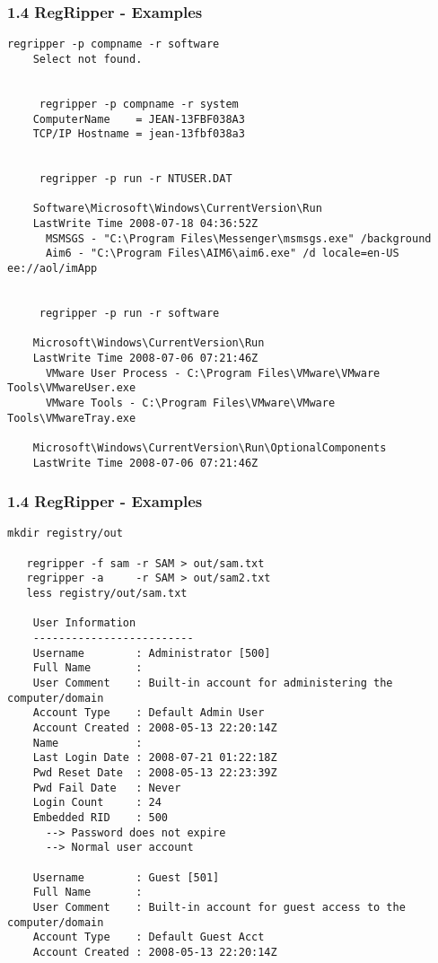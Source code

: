\begin{frame}[fragile]
  \frametitle{1.4 RegRipper - Examples}
  \begin{lstlisting}[basicstyle=\tiny]
     regripper -p compname -r software 
	Select not found.


     regripper -p compname -r system 
	ComputerName    = JEAN-13FBF038A3
	TCP/IP Hostname = jean-13fbf038a3


     regripper -p run -r NTUSER.DAT 

	Software\Microsoft\Windows\CurrentVersion\Run
	LastWrite Time 2008-07-18 04:36:52Z
	  MSMSGS - "C:\Program Files\Messenger\msmsgs.exe" /background
	  Aim6 - "C:\Program Files\AIM6\aim6.exe" /d locale=en-US ee://aol/imApp


     regripper -p run -r software 

	Microsoft\Windows\CurrentVersion\Run
	LastWrite Time 2008-07-06 07:21:46Z
	  VMware User Process - C:\Program Files\VMware\VMware Tools\VMwareUser.exe
	  VMware Tools - C:\Program Files\VMware\VMware Tools\VMwareTray.exe

	Microsoft\Windows\CurrentVersion\Run\OptionalComponents
	LastWrite Time 2008-07-06 07:21:46Z
  \end{lstlisting}
\end{frame}


\begin{frame}[fragile]
  \frametitle{1.4 RegRipper - Examples}
  \begin{lstlisting}[basicstyle=\tiny]
   mkdir registry/out

   regripper -f sam -r SAM > out/sam.txt
   regripper -a     -r SAM > out/sam2.txt
   less registry/out/sam.txt

	User Information
	-------------------------
	Username        : Administrator [500]
	Full Name       : 
	User Comment    : Built-in account for administering the computer/domain
	Account Type    : Default Admin User
	Account Created : 2008-05-13 22:20:14Z
	Name            :  
	Last Login Date : 2008-07-21 01:22:18Z
	Pwd Reset Date  : 2008-05-13 22:23:39Z
	Pwd Fail Date   : Never
	Login Count     : 24
	Embedded RID    : 500
	  --> Password does not expire
	  --> Normal user account

	Username        : Guest [501]
	Full Name       : 
	User Comment    : Built-in account for guest access to the computer/domain
	Account Type    : Default Guest Acct
	Account Created : 2008-05-13 22:20:14Z
  \end{lstlisting}
\end{frame}


